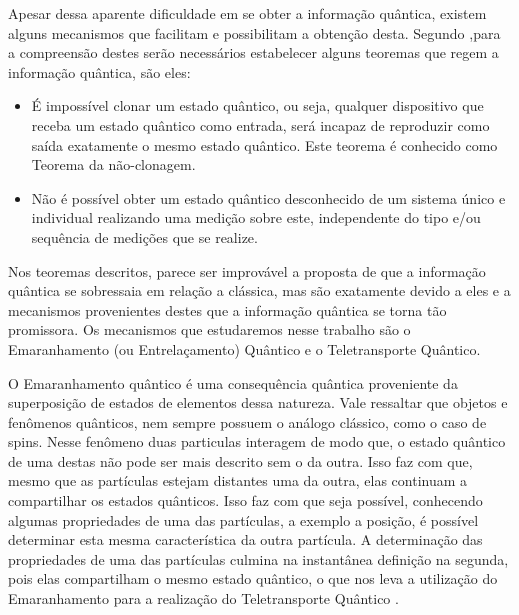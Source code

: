\documentclass[11pt,oneside,brazil,hidelinks,article,sumario=tradicional,a4paper]{abntex2}
\begin{document}
Apesar dessa aparente dificuldade em se obter a informação quântica, existem alguns mecanismos que facilitam e possibilitam a obtenção desta. Segundo \textcite{materialdidaticomecquantica},para a compreensão destes serão necessários estabelecer alguns teoremas que regem a informação quântica, são eles:

\begin{itemize}
\item É impossível clonar um estado quântico, ou seja, qualquer dispositivo que receba um estado quântico como entrada, será incapaz de reproduzir como saída exatamente o mesmo estado quântico. Este teorema é conhecido como Teorema da não-clonagem.
\item Não é possível obter um estado quântico desconhecido de um sistema único e individual realizando uma medição sobre este, independente do tipo e/ou sequência de medições que se realize.
\end{itemize}

Nos teoremas descritos, parece ser improvável a proposta de que a informação quântica se sobressaia em relação a clássica, mas são exatamente devido a eles e a mecanismos provenientes destes que a informação quântica se torna tão promissora. Os mecanismos que estudaremos nesse trabalho são o Emaranhamento (ou Entrelaçamento) Quântico e o Teletransporte Quântico.

O Emaranhamento quântico é uma consequência quântica proveniente da superposição de estados de elementos dessa natureza. Vale ressaltar que objetos e fenômenos quânticos, nem sempre possuem o análogo clássico, como o caso de spins. Nesse fenômeno duas particulas interagem de modo que, o estado quântico de uma destas não pode ser mais descrito sem o da outra. Isso faz com que, mesmo que as partículas estejam distantes uma da outra, elas continuam a compartilhar os estados quânticos. Isso faz com que seja possível, conhecendo algumas propriedades de uma das partículas, a exemplo a posição, é possível determinar esta mesma característica da outra partícula. A determinação das propriedades de uma das partículas culmina na instantânea definição na segunda, pois elas compartilham o mesmo estado quântico, o que nos leva a utilização do Emaranhamento para a realização do Teletransporte Quântico \cites{materialdidaticomecquantica}{fonzar}{TeoQuanInfoEntreCopia}.
\end{document}
